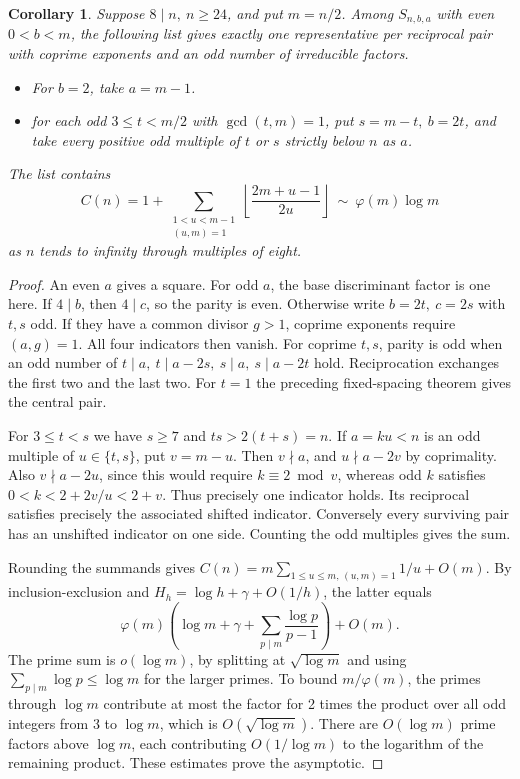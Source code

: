 \documentclass[11pt]{article}
\newtheorem{corollary}[theorem]{Corollary}
\begin{document}
\begin{corollary}\label{cor:complementary-list}
Suppose \(8\mid n,\ n\ge24\), and put \(m=n/2\).
Among \(S_{n,b,a}\) with even \(0<b<m\), the following list gives
exactly one representative per reciprocal pair with coprime exponents
and an odd number of irreducible factors.
\begin{itemize}
\item For \(b=2\), take \(a=m-1\).
\item for each odd \(3\le t<m/2\) with \(\gcd(t,m)=1\), put
\(s=m-t,\ b=2t\), and take every positive odd multiple of \(t\)
or \(s\) strictly below \(n\) as \(a\).
\end{itemize}
The list contains
\[
 C(n)=1+\sum_{\substack{1<u<m-1\\(u,m)=1}}
                     \left\lfloor\frac{2m+u-1}{2u}\right\rfloor
 \ \sim\ \varphi(m)\log m
\]
as \(n\) tends to infinity through multiples of eight.
\end{corollary}
\begin{proof}
An even \(a\) gives a square. For odd \(a\), the base discriminant
factor is one here. If \(4\mid b\), then \(4\mid c\), so the parity is
even. Otherwise write \(b=2t,\ c=2s\) with \(t,s\) odd. If they have
a common divisor \(g>1\), coprime exponents require \((a,g)=1\).
All four indicators then vanish. For coprime \(t,s\), parity is odd
when an odd number of \(t\mid a,\ t\mid a-2s,\ s\mid a,\ s\mid a-2t\)
hold. Reciprocation exchanges the first two and the last two.
For \(t=1\) the preceding fixed-spacing theorem gives the central pair.

For \(3\le t<s\) we have \(s\ge7\) and \(ts>2(t+s)=n\).
If \(a=ku<n\) is an odd multiple of \(u\in\{t,s\}\), put \(v=m-u\).
Then \(v\nmid a\), and \(u\nmid a-2v\) by coprimality.
Also \(v\nmid a-2u\), since this would require \(k\equiv2\bmod v\),
whereas odd \(k\) satisfies \(0<k<2+2v/u<2+v\). Thus precisely one
indicator holds. Its reciprocal satisfies precisely the associated
shifted indicator. Conversely every surviving pair has an unshifted
indicator on one side. Counting the odd multiples gives the sum.

Rounding the summands gives
\(C(n)=m\sum_{1\le u\le m,\,(u,m)=1}1/u+O(m)\).
By inclusion-exclusion and \(H_h=\log h+\gamma+O(1/h)\), the latter
equals
\[
 \varphi(m)\left(\log m+\gamma+
       \sum_{p\mid m}\frac{\log p}{p-1}\right)+O(m).
\]
The prime sum is \(o(\log m)\), by splitting at \(\sqrt{\log m}\)
and using \(\sum_{p\mid m}\log p\le\log m\) for the larger primes.
To bound \(m/\varphi(m)\), the primes through \(\log m\) contribute at
most the factor for 2 times the product over all odd integers from 3
to \(\log m\), which is \(O(\sqrt{\log m})\).
There are \(O(\log m)\) prime factors above \(\log m\), each contributing
\(O(1/\log m)\) to the logarithm of the remaining product.
These estimates prove the asymptotic.
\end{proof}
\end{document}
